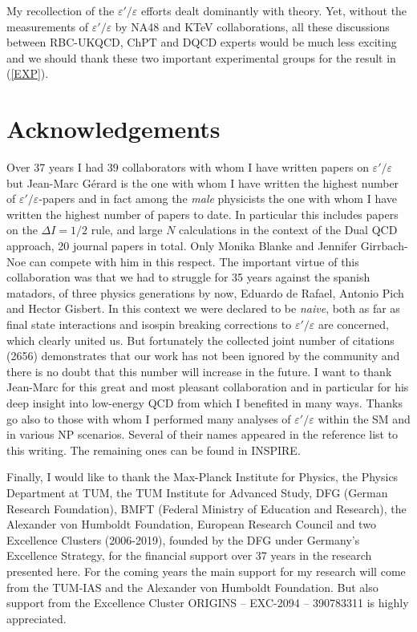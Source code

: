 \documentclass[12pt,a4paper]{article}
\def\epe{\varepsilon'/\varepsilon}
\begin{document}
My recollection of the $\epe$ efforts dealt dominantly with theory.
Yet, without the measurements of $\epe$ by NA48 and 
KTeV collaborations, all these discussions between RBC-UKQCD, ChPT and DQCD 
 experts 
would be much less exciting and we should thank these two important experimental groups 
for the result in (\ref{EXP}).

\section{Acknowledgements}
Over 37 years I had 39 collaborators with whom I have
written papers on $\epe$ but Jean-Marc G{\'e}rard is the one with whom
I have written the highest number of $\epe$-papers and in fact among the {\em male} physicists the one 
with whom I have written the highest number of papers to date. In
particular this includes papers on the $\Delta I=1/2$ rule, and large $N$ calculations in the context of the Dual QCD approach, 20 journal papers in total. Only Monika Blanke and Jennifer Girrbach-Noe can compete
with him in this respect. The important virtue of this collaboration was that we had to struggle for 35 years against the spanish matadors, of three physics generations by now,
Eduardo de Rafael, Antonio Pich and Hector Gisbert. In this context we were
declared to be {\em naive}, both as far as final state interactions and isospin breaking corrections to $\epe$ are concerned, which clearly united us. But fortunately the collected joint number of citations (2656)  demonstrates that our work has not been ignored by the community and there is no doubt that this number will increase in the future.  I want
to thank Jean-Marc for this great and most pleasant  collaboration and in particular
for his deep insight into low-energy QCD from which I benefited in many ways.
Thanks go also to those with whom I
performed many analyses of $\epe$ within the SM and in various NP scenarios.
Several of their names appeared in the reference list to this writing. The remaining ones can be found in INSPIRE.

Finally, I would like to thank the Max-Planck Institute for Physics, the Physics Department at TUM, the TUM Institute for Advanced Study, DFG (German Research Foundation), BMFT (Federal Ministry of Education and Research), the Alexander von  Humboldt Foundation, European Research
Council and two Excellence Clusters (2006-2019), founded by the DFG under Germany's Excellence Strategy, for the financial support over 37 years in the research presented
here. For the coming years the main support for my research will come from the TUM-IAS and the Alexander von  Humboldt Foundation. But also support from the Excellence Cluster ORIGINS – EXC-2094 – 390783311 is highly appreciated.
\end{document}
